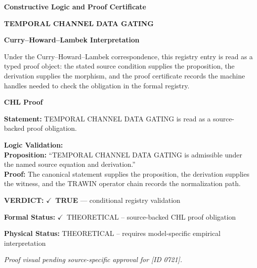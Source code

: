 \clearpage
\begingroup\tzpsupportsetup
\noindent\textbf{\fontsize{10.8pt}{12.8pt}\selectfont [ID 0721] Constructive Logic and Proof Certificate}\par
\noindent\textbf{\fontsize{10pt}{12pt}\selectfont TEMPORAL CHANNEL DATA GATING}\par
\vspace{0.45em}
\begingroup
\footnotesize
\setlength{\parskip}{0.22em}
\setlength{\parindent}{0pt}
\noindent\textbf{Curry--Howard--Lambek Interpretation}\par
Under the Curry--Howard--Lambek correspondence, this registry entry is read as a typed proof
object: the stated source condition supplies the proposition, the derivation supplies the
morphism, and the proof certificate records the machine handles needed to check the obligation
in the formal registry.

\vspace{0.45em}
\noindent\textbf{CHL Proof}\par
\textbf{Statement:} TEMPORAL CHANNEL DATA GATING is read as a source-backed proof obligation.

\textbf{Logic Validation:}\\
\textbf{Proposition:} ``TEMPORAL CHANNEL DATA GATING is admissible under the named source equation and derivation.''\\
\textbf{Proof:} The canonical statement supplies the proposition, the derivation supplies the witness, and the TRAWIN operator chain records the normalization path.

\textbf{VERDICT:} \ensuremath{\checkmark}\ \textbf{TRUE} --- conditional registry validation

\textbf{Formal Status:} \ensuremath{\checkmark}\ THEORETICAL -- source-backed CHL proof obligation

\textbf{Physical Status:} THEORETICAL -- requires model-specific empirical interpretation
\par\vspace{0.45em}
\par
\vfill
\begingroup\footnotesize\itshape
Proof visual pending source-specific approval for [ID 0721].
\par\endgroup
\vfill
\endgroup
\endgroup
